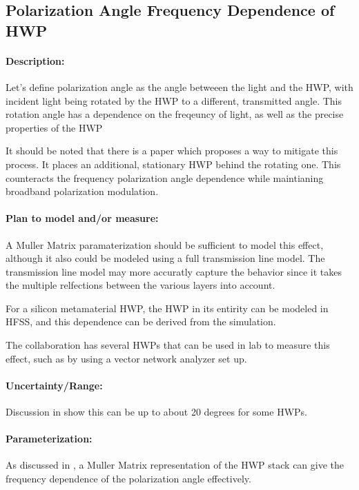 \subsection{Polarization Angle Frequency Dependence of HWP}

\paragraph{Description:}

Let's define polarization angle as the angle betweeen the light and the HWP, with incident light being rotated by the HWP to a different, transmitted angle.  This rotation angle has a dependence on the freqeuncy of light, as well as the precise properties of the HWP

It should be noted that there is a paper which proposes a way to mitigate this process\cite{Matsumura14}.  It places an additional, stationary HWP behind the rotating one.  This counteracts the frequency polarization angle dependence while maintianing broadband polarization modulation. 

\paragraph{Plan to model and/or measure:}
A Muller Matrix paramaterization should be sufficient to model this effect, although it also could be modeled using a full transmission line model.  The transmission line model may more accuratly capture the behavior since it takes the multiple relfections between the various layers into account.

For a silicon metamaterial HWP, the HWP in its entirity can be modeled in HFSS, and this dependence can be derived from the simulation.

The collaboration has several HWPs that can be used in lab to measure this effect, such as by using a vector network analyzer set up.

\paragraph{Uncertainty/Range:}
Discussion in \cite{Matsumura09} show this can be up to about 20 degrees for some HWPs.




\paragraph{Parameterization:}

As discussed in \cite{Matsumura09}, a Muller Matrix representation of the HWP stack can give the frequency dependence of the polarization angle effectively.


